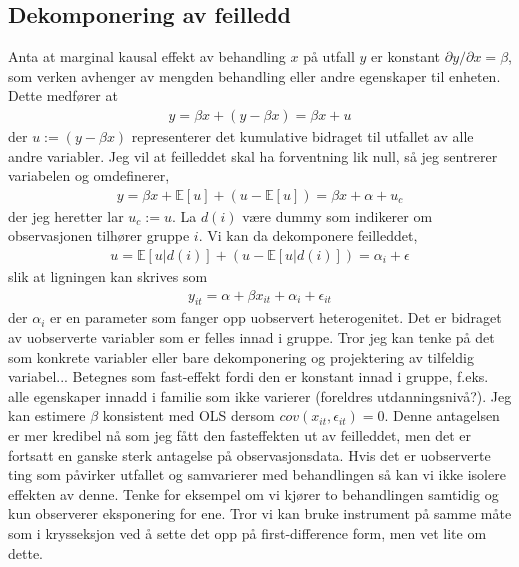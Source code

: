 \subsection{Dekomponering av feilledd}
Anta at marginal kausal effekt av behandling $x$ på utfall $y$ er konstant $\partial y/\partial x = \beta$, som verken avhenger av mengden behandling eller andre egenskaper til enheten. Dette medfører at 
\begin{align}
y=\beta x + (y-\beta x) = \beta x + u
\end{align}
der $u :=(y-\beta x)$ representerer det kumulative bidraget til utfallet av alle andre variabler. Jeg vil at feilleddet skal ha forventning lik null, så jeg sentrerer variabelen og omdefinerer,
\begin{align}
y = \beta x + \mathbb{E}[u]+(u-\mathbb{E}[u]) = \beta x + \alpha + u_c
\end{align}
der jeg heretter lar $u_c := u$.
La $d(i)$ være dummy som indikerer om observasjonen tilhører gruppe $i$. Vi kan da dekomponere feilleddet,
\begin{align}
u = \mathbb{E}[u|d(i)] + (u-\mathbb{E}[u|d(i)] ) = \alpha_i+\epsilon
\end{align}
slik at ligningen kan skrives som
\begin{align}
y_{it} = \alpha + \beta x_{it}+\alpha_i+\epsilon_{it}
\end{align}
der $\alpha_i$ er en parameter som fanger opp uobservert heterogenitet. Det er bidraget av uobserverte variabler som er felles innad i gruppe. Tror jeg kan tenke på det som konkrete variabler eller bare dekomponering og projektering av tilfeldig variabel... Betegnes som fast-effekt fordi den er konstant innad i gruppe, f.eks. alle egenskaper innadd i familie som ikke varierer (foreldres utdanningsnivå?). Jeg kan estimere $\beta$ konsistent med OLS dersom $cov(x_{it},\epsilon_{it}) = 0$. Denne antagelsen er mer kredibel nå som jeg fått den fasteffekten ut av feilleddet, men det er fortsatt en ganske sterk antagelse på observasjonsdata. Hvis det er uobserverte ting som påvirker utfallet og samvarierer med behandlingen så kan vi ikke isolere effekten av denne. Tenke for eksempel om vi kjører to behandlingen samtidig og kun observerer eksponering for ene. Tror vi kan bruke instrument på samme måte som i krysseksjon ved å sette det opp på first-difference form, men vet lite om dette.
